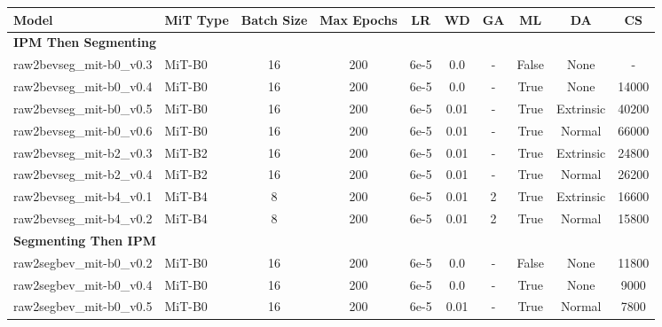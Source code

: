 \begin{table}[!ht]
    \centering
    \begin{threeparttable} %
        \tiny
        \begin{tabular}{l l | c c c c c c c c}
            \toprule
            \textbf{Model} & \textbf{MiT Type} & \textbf{Batch Size} & \textbf{Max Epochs} & \textbf{LR} & \textbf{WD} & \textbf{GA} & \textbf{ML} & \textbf{DA} & \textbf{CS} \\
            \midrule

            \multicolumn{10}{l}{\textbf{IPM Then Segmenting}} \\
            \midrule
            raw2bevseg\_mit-b0\_v0.3 & MiT-B0 & 16 & 200 & 6e-5 & 0.0 & - & False & None & - \\
            
            raw2bevseg\_mit-b0\_v0.4 & MiT-B0 & 16 & 200 & 6e-5 & 0.0 & - & True & None & 14000 \\

            raw2bevseg\_mit-b0\_v0.5 & MiT-B0 & 16 & 200 & 6e-5 & 0.01 & - & True & Extrinsic & 40200 \\
            raw2bevseg\_mit-b0\_v0.6 & MiT-B0 & 16 & 200 & 6e-5 & 0.01 & - & True & Normal & 66000 \\
            

            raw2bevseg\_mit-b2\_v0.3 & MiT-B2 & 16 & 200 & 6e-5 & 0.01 & - & True & Extrinsic & 24800 \\
            raw2bevseg\_mit-b2\_v0.4 & MiT-B2 & 16 & 200 & 6e-5 & 0.01 & - & True & Normal & 26200 \\
            
            raw2bevseg\_mit-b4\_v0.1 & MiT-B4 & 8 & 200 & 6e-5 & 0.01 & 2 & True & Extrinsic & 16600 \\
            raw2bevseg\_mit-b4\_v0.2 & MiT-B4 & 8 & 200 & 6e-5 & 0.01 & 2 & True & Normal & 15800 \\
            
            \midrule[1pt]
            \multicolumn{10}{l}{\textbf{Segmenting Then IPM}} \\
            \midrule
            raw2segbev\_mit-b0\_v0.2 & MiT-B0 & 16 & 200 & 6e-5 & 0.0 & - & False & None & 11800 \\
            
            raw2segbev\_mit-b0\_v0.4 & MiT-B0 & 16 & 200 & 6e-5 & 0.0 & - & True & None & 9000 \\
            raw2segbev\_mit-b0\_v0.5 & MiT-B0 & 16 & 200 & 6e-5 & 0.01 & - & True & Normal & 7800 \\
            

\end{tabular}
\end{threeparttable}
\end{table}
